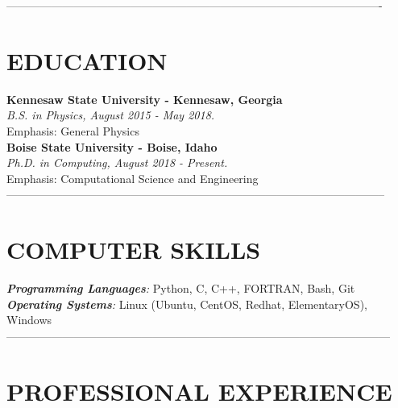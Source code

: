 \documentclass[margin, 10pt]{res} %
\begin{document}
\begin{resume}


----------------------------------------------------------------------------------------------------

\section{EDUCATION}

\textbf{Kennesaw State University - Kennesaw, Georgia} \\
{\sl B.S. in Physics, August 2015 - May 2018.}  \\
Emphasis: General Physics\\


\textbf{Boise State University - Boise, Idaho} \\
{\sl Ph.D. in Computing, August 2018 - Present.} \\
Emphasis: Computational Science and Engineering  \\


-----------------------------------------------------------------------------------------------------

\section{COMPUTER SKILLS}

{\sl \textbf{Programming Languages}:}
Python, C, C++, FORTRAN, Bash, Git \\
{\sl \textbf{Operating Systems}:} Linux (Ubuntu, CentOS, Redhat, ElementaryOS), Windows \\
 
------------------------------------------------------------------------------------------------------
 
\section{PROFESSIONAL EXPERIENCE} 


\end{resume}
\end{document}
